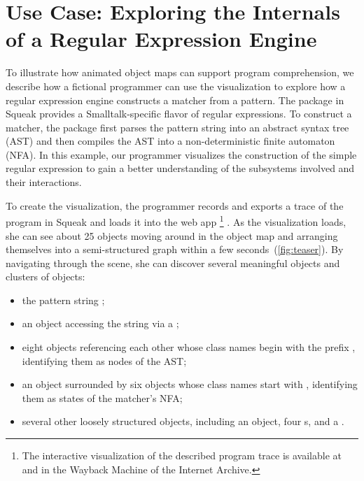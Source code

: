 \section{Use Case: Exploring the Internals of a Regular Expression Engine}
\label{sec:use_case}

To illustrate how animated object maps can support program comprehension, we describe how a fictional programmer can use the \tfd{} visualization to explore how a regular expression engine constructs a matcher from a pattern.
The  package in Squeak provides a Smalltalk-specific flavor of regular expressions.
To construct a matcher, the package first parses the pattern string into an abstract syntax tree (AST) and then compiles the AST into a non-deterministic finite automaton (NFA).
In this example, our programmer visualizes the construction of the simple regular expression  to gain a better understanding of the subsystems involved and their interactions.

To create the visualization, the programmer records and exports a trace of the program  in Squeak and loads it into the \tfd{} web app%
\footnote{The interactive visualization of the described program trace is available at  and in the Wayback Machine of the Internet Archive.}%
.
As the visualization loads, she can see about 25 objects moving around in the object map and arranging themselves into a semi-structured graph within a few seconds~(\cref{fig:teaser}).
By navigating through the scene, she can discover several meaningful objects and clusters of objects:

\begin{itemize}
	\item the pattern string ;
	\item an  object accessing the string via a ;
	\item eight objects referencing each other whose class names begin with the prefix , identifying them as nodes of the AST;
	\item an  object surrounded by six objects whose class names start with , identifying them as states of the matcher's NFA;
	\item several other loosely structured objects, including an  object, four s, and a .
\end{itemize}

